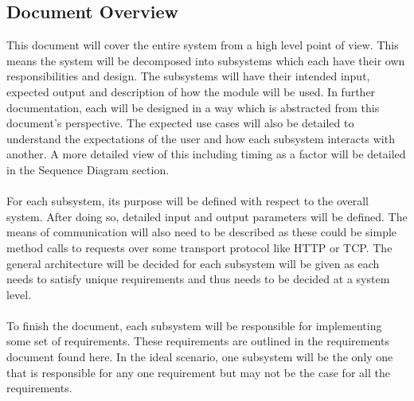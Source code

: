 \documentclass[11pt]{article}
\begin{document}
\subsection{Document Overview}
This document will cover the entire system from a high level point of view. This means the system will be decomposed into subsystems which each have their own responsibilities and design. The subsystems will have their intended input, expected output and description of how the module will be used. In further documentation, each will be designed in a way which is abstracted from this document's perspective. The expected use cases will also be detailed to understand the expectations of the user and how each subsystem interacts with another. A more detailed view of this including timing as a factor will be detailed in the Sequence Diagram section. \\ \\
For each subsystem, its purpose will be defined with respect to the overall system. After doing so, detailed input and output parameters will be defined. The means of communication will also need to be described as these could be simple method calls to requests over some transport protocol like HTTP or TCP. The general architecture will be decided for each subsystem will be given as each needs to satisfy unique requirements and thus needs to be decided at a system level. \\ \\
To finish the document, each subsystem will be responsible for implementing some set of requirements. These requirements are outlined in the requirements document found here. %
In the ideal scenario, one subsystem will be the only one that is responsible for any one requirement but may not be the case for all the requirements. 
\end{document}
